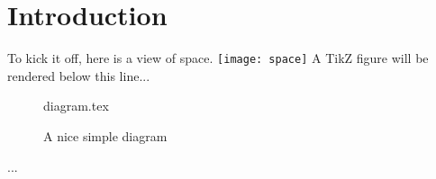 \documentclass[float=false, crop=false]{standalone}
\begin{document}
\chapter{Introduction}
To kick it off, here is a view of space. 
\texttt{[image: space]}
A TikZ figure will be rendered below this line...
 
\begin{figure}[ht]
 
{diagram.tex}
 
\label{fig:tikzexample}
\caption{A nice simple diagram}
\end{figure}
 
...
\end{document}
